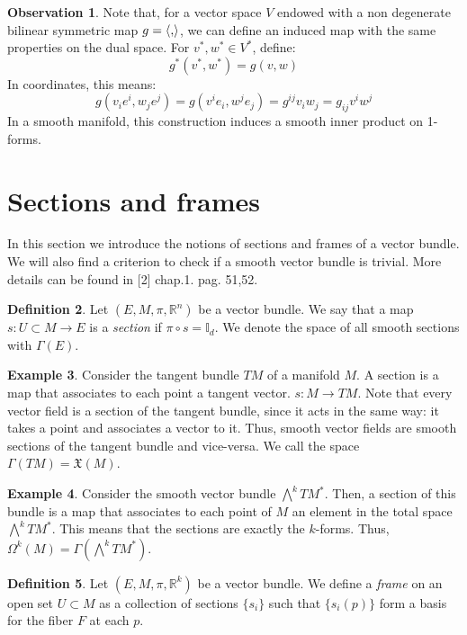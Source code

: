 \documentclass[12pt,a4paper]{report}
\theoremstyle{definition}
\newtheorem{Def}{Definition}[chapter]
\theoremstyle{Theorem}
\theoremstyle{definition}
\newtheorem{Ex}[Def]{Example}
\theoremstyle{definition}
\newtheorem{Obs}[Def]{Observation}
\begin{document}
	\begin{Obs}
		Note that, for a vector space $V$ endowed with a non degenerate bilinear symmetric map $g=\braket{,}$, we can define an induced map with the same properties on the dual space. For $v^*,w^*\in V^*$, define:
		$$g^*(v^*,w^*)=g(v,w)$$
		In coordinates, this means:
		$$g(v_ie^i,w_je^j)=g(v^ie_i,w^je_j)=g^{ij}v_iw_j=g_{ij}v^iw^j$$
		In a smooth manifold, this construction induces a smooth inner product on 1-forms.
	\end{Obs}
	\section{Sections and frames}
	In this section we introduce the notions of sections and frames of a vector bundle. We will also find a criterion to check if a smooth vector bundle is trivial. More details can be found in [2] chap.1. pag. 51,52.
	\begin{Def}\label{Def_5.5}
		Let $(E,M,\pi,\mathbb{R}^n)$ be a vector bundle. We say that a map \\$s:U\subset M\rightarrow E$ is a \textit{section} if $\pi\circ s=\mathbb{I}_d$. We denote the space of all smooth sections with $\Gamma(E)$.
	\end{Def}
	\begin{Ex}
		Consider the tangent bundle $TM$ of a manifold $M$. A section is a map that associates to each point a tangent vector. $s:M\rightarrow TM$. Note that every vector field is a section of the tangent bundle, since it acts in the same way: it takes a point and associates a vector to it. Thus, smooth vector fields are smooth sections of the tangent bundle and vice-versa. We call the space $\Gamma(TM)=\mathfrak{X}(M)$.
	\end{Ex}
	\begin{Ex}
		Consider the smooth vector bundle $\bigwedge^kTM^*$. Then, a section of this bundle is a map that associates to each point of $M$ an element in the total space $\bigwedge^kTM^*$. This means that the sections are exactly the $k$-forms. Thus, $\Omega^k(M)=\Gamma(\bigwedge^kTM^*)$.
	\end{Ex}
	\begin{Def}\label{Def_5.6}
		Let $(E,M,\pi,\mathbb{R}^k)$ be a vector bundle. We define a \textit{frame} on an open set $U\subset M$ as a collection of sections $\{s_i\}$ such that $\{s_i(p)\}$ form a basis for the fiber $F$ at each $p$. 
	\end{Def}
\end{document}

